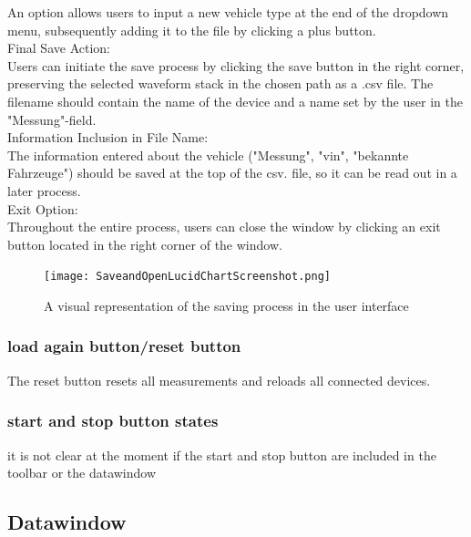 \documentclass{scrreprt}
\begin{document}
An option allows users to input a new vehicle type at the end of the dropdown menu, subsequently adding it to the file by clicking a plus button.\\

Final Save Action:\\

Users can initiate the save process by clicking the save button in the right corner, preserving the selected waveform stack in the chosen path as a .csv file. The filename should contain the name of the device and a name set by the user in the "Messung"-field.\\

Information Inclusion in File Name:\\

The information entered about the vehicle ("Messung", "vin", "bekannte Fahrzeuge") should be saved at the top of the csv. file, so it can be read out in a later process.\\

Exit Option:\\

Throughout the entire process, users can close the window by clicking an exit button located in the right corner of the window.\\


\begin{figure}
    \texttt{[image: SaveandOpenLucidChartScreenshot.png]}
    \caption[]{A visual representation of the saving process in the user interface}
    \label{fig:saveData}
\end{figure}

\subsubsection{load again button/reset button}

The reset button resets all measurements and reloads all connected devices.


\subsubsection{start and stop button states}

it is not clear at the moment if the start and stop button are included in the toolbar or the datawindow



\subsection{Datawindow}
\end{document}
